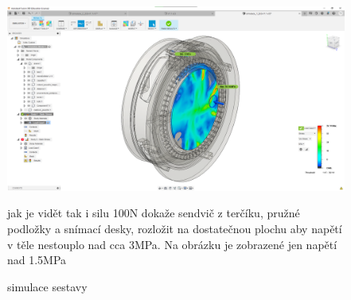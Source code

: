 \begin{figure}[htbp]
    \centering
    \includegraphics[width=\textwidth]{kapitoly/obrazky/E4/machanika_tlakove_desky/simulace/zjednodusena_sestava_pri_F100N_nezobrazeno_napeti_pod_1,5MPa.png}
    \caption{simulace sestavy}
    jak je vidět tak i silu 100N dokaže sendvič z terčíku, pružné podložky a snímací desky, rozložit na dostatečnou plochu aby napětí v těle nestouplo 
    nad cca 3MPa. Na obrázku je zobrazené jen napětí nad 1.5MPa
    \label{fig:E4-simulace_tlakovky}
\end{figure}

\clearpage
\newpage